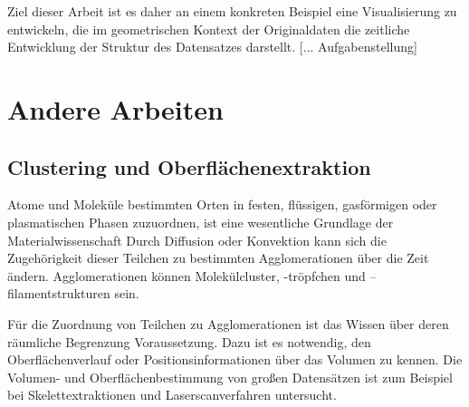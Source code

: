 Ziel dieser Arbeit ist es daher an einem konkreten Beispiel eine Visualisierung zu entwickeln, die im geometrischen Kontext der Originaldaten die zeitliche Entwicklung der Struktur des Datensatzes darstellt. [... Aufgabenstellung]

\chapter{Andere Arbeiten}

\section{Clustering und Oberflächenextraktion}

Atome und Moleküle bestimmten Orten in festen, flüssigen, gasförmigen oder plasmatischen Phasen zuzuordnen, ist eine wesentliche Grundlage der Materialwissenschaft %
Durch Diffusion oder Konvektion kann sich die Zugehörigkeit dieser Teilchen zu bestimmten Agglomerationen über die Zeit ändern. Agglomerationen können Molekülcluster, -tröpfchen und –filamentstrukturen sein. 

Für die Zuordnung von Teilchen zu Agglomerationen ist das Wissen über deren räumliche Begrenzung Voraussetzung. Dazu ist es notwendig, den Oberflächenverlauf oder Positionsinformationen über das Volumen zu kennen. Die Volumen- und Oberflächenbestimmung von großen Datensätzen ist zum Beispiel bei Skelettextraktionen und Laserscanverfahren untersucht.

